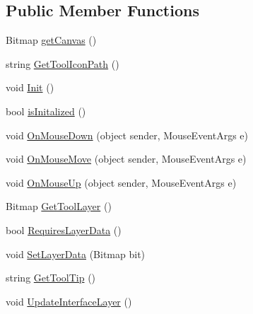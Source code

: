 \subsection*{Public Member Functions}
\begin{DoxyCompactItemize}
\item 
Bitmap \mbox{\hyperlink{class_paint___program_1_1_eraser_tool_ab06fce2e3aefa1a4ce27e861f8036923}{get\+Canvas}} ()
\item 
string \mbox{\hyperlink{class_paint___program_1_1_eraser_tool_a5a1cb5d84a01983064c68a8dc6023ae6}{Get\+Tool\+Icon\+Path}} ()
\item 
void \mbox{\hyperlink{class_paint___program_1_1_eraser_tool_ac19c1e6bfa1b51a384f1f9b1eaa0b2ea}{Init}} ()
\item 
bool \mbox{\hyperlink{class_paint___program_1_1_eraser_tool_a4093d09a604ab0f535497b64447a0013}{is\+Initalized}} ()
\item 
void \mbox{\hyperlink{class_paint___program_1_1_eraser_tool_a4af3cc5379de2a2aec2a5d622801ca86}{On\+Mouse\+Down}} (object sender, Mouse\+Event\+Args e)
\item 
void \mbox{\hyperlink{class_paint___program_1_1_eraser_tool_a1a4e26847ca43fc583017ea76396c19c}{On\+Mouse\+Move}} (object sender, Mouse\+Event\+Args e)
\item 
void \mbox{\hyperlink{class_paint___program_1_1_eraser_tool_aac92273a8f10a9f9cee6e03b1337f1c5}{On\+Mouse\+Up}} (object sender, Mouse\+Event\+Args e)
\item 
Bitmap \mbox{\hyperlink{class_paint___program_1_1_eraser_tool_a2ba0d80771829d2410b5d9a26a6896b2}{Get\+Tool\+Layer}} ()
\item 
bool \mbox{\hyperlink{class_paint___program_1_1_eraser_tool_a2cc4463cfa0525b3687bb227204eaa05}{Requires\+Layer\+Data}} ()
\item 
void \mbox{\hyperlink{class_paint___program_1_1_eraser_tool_ae7daaebe9133c249978d52183a026699}{Set\+Layer\+Data}} (Bitmap bit)
\item 
string \mbox{\hyperlink{class_paint___program_1_1_eraser_tool_ae2c24c146b6269c7eae8b5c196298f5c}{Get\+Tool\+Tip}} ()
\item 
void \mbox{\hyperlink{class_paint___program_1_1_eraser_tool_a0776bb064faa9462f0f224f461a56f31}{Update\+Interface\+Layer}} ()
\end{DoxyCompactItemize}
